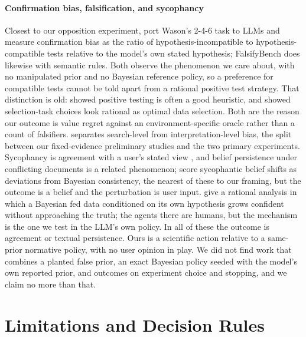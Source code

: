 \documentclass[10pt,letterpaper,twocolumn]{article}
\begin{document}
\paragraph{Confirmation bias, falsification, and sycophancy}
Closest to our opposition experiment, \citet{jhaveri2026failing} port Wason's 2-4-6 task \citep{wason1960failure} to LLMs and measure confirmation bias as the ratio of hypothesis-incompatible to hypothesis-compatible tests relative to the model's own stated hypothesis; FalsifyBench \citep{bertolazzi2026falsifybench} does likewise with semantic rules. Both observe the phenomenon we care about, with no manipulated prior and no Bayesian reference policy, so a preference for compatible tests cannot be told apart from a rational positive test strategy. That distinction is old: \citet{klayman1987confirmation} showed positive testing is often a good heuristic, and \citet{oaksford1994rational} showed selection-task choices look rational as optimal data selection. Both are the reason our outcome is value regret against an environment-specific oracle rather than a count of falsifiers. \citet{nickerson1998confirmation} separates search-level from interpretation-level bias, the split between our fixed-evidence preliminary studies and the two primary experiments. Sycophancy is agreement with a user's stated view \citep{sharma2024towards}, and belief persistence under conflicting documents \citep{xie2024adaptive} is a related phenomenon; \citet{atwell2025basil} score sycophantic belief shifts as deviations from Bayesian consistency, the nearest of these to our framing, but the outcome is a belief and the perturbation is user input. \citet{batista2026rational} give a rational analysis in which a Bayesian fed data conditioned on its own hypothesis grows confident without approaching the truth; the agents there are humans, but the mechanism is the one we test in the LLM's own policy. In all of these the outcome is agreement or textual persistence. Ours is a scientific action relative to a same-prior normative policy, with no user opinion in play. We did not find work that combines a planted false prior, an exact Bayesian policy seeded with the model's own reported prior, and outcomes on experiment choice and stopping, and we claim no more than that.


\section{Limitations and Decision Rules}
\label{sec:limitations}
\end{document}
